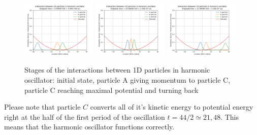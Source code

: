 \begin{figure}
	\begin{center}
		\includegraphics[width=0.32\textwidth]{figures/1d_oscillator_01.png}
		\includegraphics[width=0.32\textwidth]{figures/1d_oscillator_02.png}
		\includegraphics[width=0.32\textwidth]{figures/1d_oscillator_03.png}
		\caption{Stages of the interactions between 1D particles in harmonic oscillator: initial state, particle A giving momentum to particle C, particle C reaching maximal potential and turning back}
		\label{fig:1d_particles_in_oscillator_stages}
	\end{center}	
\end{figure}
Please note that particle $C$ converts all of it's kinetic energy to potential energy right at the half of the first period of the oscillation $t = 44 / 2 \simeq 21,48$.
This means that the harmonic oscillator functions correctly.

